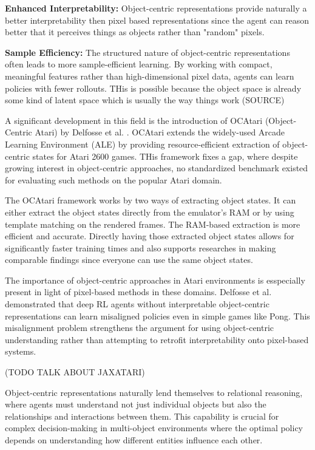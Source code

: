 \documentclass[
	english,
	ruledheaders=section,
	class=report,
	thesis={type=master},
	accentcolor=9c,
	custommargins=true,
	marginpar=false,
	parskip=half-,
	fontsize=11pt,
]{tudapub}
\begin{document}
\textbf{Enhanced Interpretability:} Object-centric representations provide naturally a better interpretability then pixel based representations since the agent can reason better that it perceives things as objects rather than "random" pixels.

\textbf{Sample Efficiency:} The structured nature of object-centric representations often leads to more sample-efficient learning. By working with compact, meaningful features rather than high-dimensional
 pixel data, agents can learn policies with fewer rollouts. THis is possible because the object space is already some kind of latent space which is usually the way things work (SOURCE)

A significant development in this field is the introduction of OCAtari (Object-Centric Atari) by Delfosse et al. \cite{delfosse2024ocatariobjectcentricatari2600}. OCAtari extends the widely-used Arcade
 Learning Environment (ALE) by providing resource-efficient extraction of object-centric states for Atari 2600 games. THis framework fixes a gap, where despite growing interest in object-centric approaches,
no standardized benchmark existed for evaluating such methods on the popular Atari domain.



The OCAtari framework works by two ways of extracting object states. It can either extract the object states directly from the emulator's RAM or by using template matching on the rendered frames. 
The RAM-based extraction is more efficient and accurate.
Directly having those extracted object states allows for significantly faster training times and also supports researches in making comparable findings since everyone can use the same object states.

The importance of object-centric approaches in Atari environments is esspecially present in light of pixel-based methods in these domains. Delfosse et al. demonstrated that deep 
RL agents without interpretable object-centric representations can learn misaligned policies even in simple games like Pong. \cite{delfosse2024interpretableconceptbottlenecksalign} 
This misalignment problem strengthens the argument for using object-centric understanding rather than attempting to retrofit interpretability onto pixel-based systems.

(TODO TALK ABOUT JAXATARI)


Object-centric representations naturally lend themselves to relational reasoning, where agents must understand not just individual objects but also
the relationships and interactions between them. This capability is crucial for complex decision-making in multi-object environments where the
 optimal policy depends on understanding how different entities influence each other.
\end{document}
